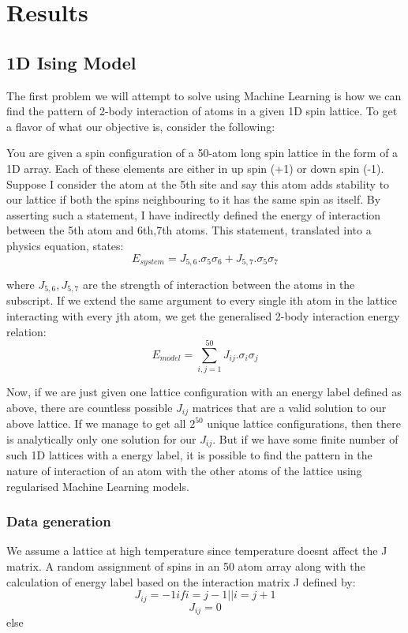 \section{Results}
\subsection{1D Ising Model}
The first problem we will attempt to solve using Machine Learning is how we can find the pattern of 2-body interaction of atoms in a given 1D spin lattice. To get a flavor of what our objective is, consider the following:

You are given a spin configuration of a 50-atom long spin lattice in the form of a 1D array. Each of these elements are either in up spin (+1) or down spin (-1). Suppose I consider the atom at the 5th site and say this atom adds stability to our lattice if both the spins neighbouring to it has the same spin as itself. By asserting such a statement, I have indirectly defined the energy of interaction between the 5th atom and 6th,7th atoms. This statement, translated into a physics equation, states: \[ E_{system}=J_{5,6}.\sigma_5\sigma_6+J_{5,7}.\sigma_5\sigma_7\]

where \(J_{5,6}, J_{5,7}\) are the strength of interaction between the atoms in the subscript. If we extend the same argument to every single ith atom in the lattice interacting with every jth atom, we get the generalised 2-body interaction energy relation: \[E_{model}=\sum_{i,j=1}^{50}J_{ij}.\sigma_i\sigma_j\]

Now, if we are just given one lattice configuration with an energy label defined as above, there are countless possible \(J_{ij}\) matrices that are a valid solution to our above lattice. If we manage to get all \(2^{50}\) unique lattice configurations, then there is analytically only one solution for our \(J_{ij}\). But if we have some finite number of such 1D lattices with a energy label, it is possible to find the pattern in the nature of interaction of an atom with the other atoms of the lattice using regularised Machine Learning models.

\subsubsection{Data generation}
We assume a lattice at high temperature since temperature doesnt affect the J matrix. A random assignment of spins in an 50 atom array along with the calculation of energy label based on the interaction matrix J defined by:
\[J_{ij}=-1 if i=j-1 || i=j+1\]
\[J_{ij}=0\] else

